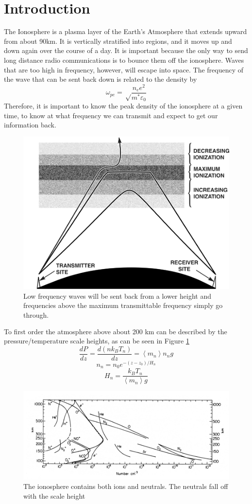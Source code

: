 \documentclass[12pt]{IEEEtran}
\begin{document}
\section{Introduction}
\IEEEPARstart T{he Ionosphere} is a plasma layer of the Earth's Atmosphere that extends upward from about 90km. It is vertically stratified into regions, and it moves up and down again over the course of a day. It is important because the only way to send long distance radio communications is to bounce them off the ionosphere. Waves that are too high in frequency, however, will escape into space. The frequency of the wave that can be sent back down is related to the density by
$$\omega_{pe} = \sqrt\frac{n_e e^2}{m^*\varepsilon_0}$$
Therefore, it is important to know the peak density of the ionosphere at a given time, to know at what frequency we can transmit and expect to get our information back. 
\begin{figure}
  \includegraphics[width=.25\textwidth]{bounce}
  \caption{ Low frequency waves will be sent back from a lower height and frequencies above the maximum transmittable frequency simply go through.  }
  \vspace{1cm}
\end{figure}

 To first order the atmosphere above about 200 km can be
 described by the pressure/temperature scale heights, as can be seen in Figure \ref{atmos}
 \clearpage 
$$\frac{dP}{dz}=\frac{d \left( nk_BT_n \right)}{dz} = \left< m_n \right> n_ng$$
$$n_n=n_0 e^{-\left( z-z_0 \right)/H_n}$$
$$H_n = \frac{k_BT_n}{\left< m_n \right>g}$$
\begin{figure}[tbp]
  \includegraphics[width=.5\textwidth]{atmos}
  \caption{The ionosphere contains both ions and neutrals. The neutrals fall off with the scale height}
  \label{atmos}
\end{figure}
\end{document}
